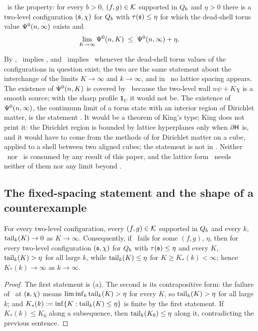 \begin{definition}\label{rot:hyp:REScont}
\REcont\ is the property: for every $b>0$, $(f,g)\in\mathcal K$ supported in $Q_{b}$ and $\eta>0$ there is a two-level configuration $(\mathfrak s,\chi)$ for $Q_{b}$ with $\tau(\mathfrak s)\le\eta$ for which the dead-shell torus value $\Psi^0(n,\infty)$ exists and
\[
\lim_{K\to\infty}\Psi^0(n,K)\;\le\;\Psi^0(n,\infty)+\eta .
\]
\end{definition}

By , \REcont\ implies \REa, and \REa\ implies \REcont\ whenever the dead-shell torus values of the configurations in question exist; the two are the same statement about the interchange of the limits $K\to\infty$ and $k\to\infty$, and in \REcont\ no lattice spacing appears. The existence of $\Psi^0(n,K)$ is covered by \Ka\ because the two-level wall $n\psi+K\chi$ is a smooth source; with the sharp profile $\mathbf 1_U$ it would not be. The existence of $\Psi^0(n,\infty)$, the continuum limit of a torus state with an interior region of Dirichlet matter, is the statement \Einf. It would be a theorem of King's type; King does not print it: the Dirichlet region is bounded by lattice hyperplanes only when $\partial\mathsf H$ is, and it would have to come from the methods of \cite{K2} for Dirichlet matter on a cube, applied to a shell between two aligned cubes; the statement is not in \cite{K1,K2}. Neither \Einf\ nor \REcont\ is consumed by any result of this paper, and the lattice form \REa\ needs neither of them nor any limit beyond \Ka.

\subsection{The fixed-spacing statement and the shape of a counterexample}

\begin{proposition}\label{rot:prop:fixedeps}
For every two-level configuration, every $(f,g)\in\mathcal K$ supported in $Q_{b}$ and every $k$, $\operatorname{tail}_k(K)\to0$ as $K\to\infty$. Consequently, if \REa\ fails for some $(f,g)$, $\eta$, then for every two-level configuration $(\mathfrak s,\chi)$ for $Q_{b}$ with $\tau(\mathfrak s)\le\eta$ and every $K$, $\operatorname{tail}_k(K)>\eta$ for all large $k$, while $\operatorname{tail}_k(K)\le\eta$ for $K\ge K_*(k)<\infty$; hence $K_*(k)\to\infty$ as $k\to\infty$.
\end{proposition}

\begin{proof}
The first statement is (a). The second is its contrapositive form: the failure of \REa\ at $(\mathfrak s,\chi)$ means $\liminf_k\operatorname{tail}_k(K)>\eta$ for every $K$, so $\operatorname{tail}_k(K)>\eta$ for all large $k$; and $K_*(k):=\inf\{K:\operatorname{tail}_k(K)\le\eta\}$ is finite by the first statement. If $K_*(k)\le K_0$ along a subsequence, then $\operatorname{tail}_k(K_0)\le\eta$ along it, contradicting the previous sentence.
\end{proof}


